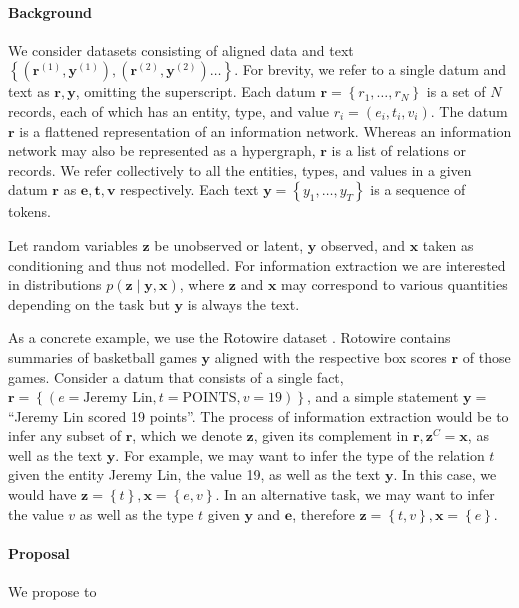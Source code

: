 \documentclass[11pt]{article}
\newcommand\set[1]{\left\{#1\right\}}
\newcommand{\be}{\mathbf{e}}
\newcommand{\br}{\mathbf{r}}
\newcommand{\bt}{\mathbf{t}}
\newcommand{\bv}{\mathbf{v}}
\newcommand{\bx}{\mathbf{x}}
\newcommand{\by}{\mathbf{y}}
\newcommand{\bz}{\mathbf{z}}
\begin{document}
\paragraph{Background}
We consider datasets consisting of aligned data and text
$\set{(\br^{(1)}, \by^{(1)}),(\br^{(2)},\by^{(2)})\ldots}$.
For brevity, we refer to a single datum and text as $\br,\by$, omitting the superscript.
Each datum $\br = \set{r_1,\ldots,r_N}$ is a set of $N$ records, each of which has
an entity, type, and value $r_i = (e_i, t_i, v_i)$.
The datum $\br$ is a flattened representation of an information network.
Whereas an information network may also be represented as a hypergraph,
$\br$ is a list of relations or records.
We refer collectively to all the entities, types, and values in a given datum $\br$ as
$\be,\bt,\bv$ respectively.
Each text $\by = \set{y_1,\ldots,y_T}$ is a sequence of tokens.

Let random variables $\bz$ be unobserved or latent, $\by$ observed, and $\bx$ taken as conditioning
and thus not modelled.
For information extraction we are interested in distributions $p(\bz\mid\by,\bx)$,
where $\bz$ and $\bx$ may correspond to various quantities depending on the task
but $\by$ is always the text.

As a concrete example, we use the Rotowire dataset \citep{wiseman2017d2t}.
Rotowire contains summaries of basketball games $\by$ aligned with the respective
box scores $\br$ of those games.
Consider a datum that consists of a single fact,
$\br = \set{(e = \textrm{Jeremy Lin}, t = \textrm{POINTS}, v = 19)}$,
and a simple statement $\by = $``Jeremy Lin scored 19 points''.
The process of information extraction would be to infer any
subset of $\br$, which we denote $\bz$, given its complement in $\br, \bz^C=\bx$,
as well as the text $\by$.
For example, we may want to infer the type of the relation $t$ given 
the entity Jeremy Lin, the value 19, as well as the text $\by$.
In this case, we would have $\bz = \set{t}, \bx = \set{e,v}$.
In an alternative task, we may want to infer the value $v$ 
as well as the type $t$ given $\by$ and $\be$, therefore $\bz = \set{t,v}, \bx=\set{e}$.

\paragraph{Proposal}
We propose to 
\end{document}
